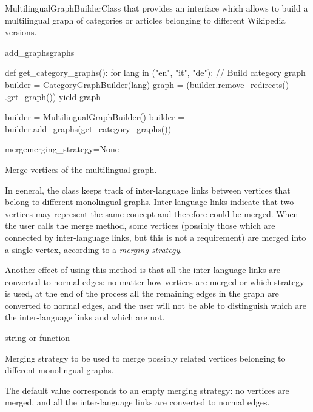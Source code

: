 \begin{classdoc}{MultilingualGraphBuilder}{Class that provides an interface which allows to build a multilingual graph of categories or articles belonging to different Wikipedia versions.}
\begin{classmethod}{add\_graphs}{graphs}
                    \begin{functionexample}
def get_category_graphs():
    for lang in ("en", "it", "de"):
        // Build category graph
        builder = CategoryGraphBuilder(lang)
        graph = (builder.remove_redirects()
                        .get_graph())
        yield graph

builder = MultilingualGraphBuilder()
builder = builder.add_graphs(get_category_graphs())
                    \end{functionexample}
                \end{classmethod}
                \item \begin{classmethod}{merge}{merging\_strategy=None}
                
                    \begin{functiondescription}
                        Merge vertices of the multilingual graph.
                        
                        In general, the  class keeps track of inter-language links between vertices that belong to different monolingual graphs. Inter-language links indicate that two vertices may represent the same concept and therefore could be merged. When the user calls the merge method, some vertices (possibly those which are connected by inter-language links, but this is not a requirement) are merged into a single vertex, according to a \emph{merging strategy}.
                        
                        Another effect of using this method is that all the inter-language links are converted to normal edges: no matter how vertices are merged or which strategy is used, at the end of the process all the remaining edges in the graph are converted to normal edges, and the user will not be able to distinguish which are the inter-language links and which are not.
                    \end{functiondescription}
                    
                    \begin{functionparameters}
                        \item[merging\_strategy] string or function
                        
                        Merging strategy to be used to merge possibly related vertices belonging to different monolingual graphs.
                        
                        The default value  corresponds to an empty merging strategy: no vertices are merged, and all the inter-language links are converted to normal edges.
                        

\end{functionparameters}
\end{classmethod}
\end{classdoc}

